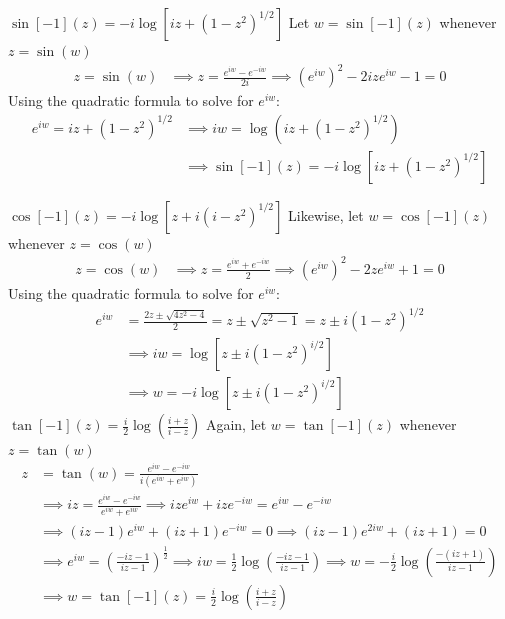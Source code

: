 \documentclass[12pt, english]{book}
\makeatletter
\renewenvironment{proof}[1][\proofname]{\par
	\pushQED{\qed}%
	\normalfont \topsep6\p@\@plus6\p@\relax
	\list{}{%
		\settowidth{\leftmargin}{\itshape\proofname:\hskip\labelsep}%
		\setlength{\labelwidth}{0pt}%
		\setlength{\itemindent}{-\leftmargin}%
		}%
	\item[\hskip\labelsep\itshape#1\@addpunct{:}]\ignorespaces
	}{\popQED\endlist\@endpefalse}
\makeatother
\begin{document}
	\begin{proof}
	\underline{\(\sin[-1](z) = -i \log[iz + (1-z^2)^{1/2}] \)} \newline
	Let \(w = \sin[-1](z)\) whenever \(z = \sin(w)\)
	\begin{align*}
		z = \sin(w)
		&\implies z = \frac{e^{iw} - e^{-iw}}{2i}
		 \implies (e^{iw})^2 - 2iz e^{iw} - 1 = 0
	\end{align*}
	Using the quadratic formula to solve for \(e^{iw}\): 
	\begin{align*}
		e^{iw} = iz + (1 - z^2)^{1/2} 
		&\implies iw = \log\left( iz + (1 - z^2)^{1/2} \right) \\
		&\implies \sin[-1](z) = -i \log\left[ iz + (1 - z^2)^{1/2} \right]
	\end{align*}

	\underline{\(\cos[-1](z) = -i \log[z + i(i-z^2)^{1/2}]\)} \newline
	{\color{Grey}
	Likewise, let \(w = \cos[-1](z)\) whenever \(z = \cos(w)\)
	\begin{align*}
		z = \cos(w)
		&\implies z = \frac{e^{iw} + e^{-iw}}{2}
		 \implies (e^{iw})^2 - 2ze^{iw} + 1 = 0
	\end{align*}
	Using the quadratic formula to solve for \(e^{iw}\): 
	\begin{align*}
		e^{iw} 
		&= \frac{2z \pm \sqrt{4z^2 - 4}}{2} = z \pm \sqrt{z^2 - 1} = z \pm i (1-z^2)^{1/2} \\
		&\implies iw = \log\left[z \pm i(1-z^2)^{i/2}\right] \\
		&\implies  w = -i\log\left[z \pm i(1-z^2)^{i/2}\right] 
	\end{align*}
	}
	\underline{\(\tan[-1](z) = \frac{i}{2} \log\left(\frac{i + z}{i - z}\right)\)} \newline
	{\color{Grey}
	Again, let \(w = \tan[-1](z)\) whenever \(z = \tan(w)\)
	\begin{align*}
		z &= \tan(w) = \frac{e^{iw} - e^{-iw}}{i(e^{iw} + e^{iw})} \\
		&\implies iz = \frac{e^{iw} - e^{-iw}}{e^{iw} + e^{iw}}
		\implies iz e^{iw} + iz e^{-iw} = e^{iw} - e^{-iw} \\
		&\implies (iz - 1)e^{iw} + (iz + 1)e^{-iw} = 0 
		\implies (iz - 1)e^{2iw} + (iz + 1) = 0 \\
		&\implies e^{iw} = \left(\frac{-iz - 1}{iz - 1}\right)^\frac{1}{2} 
		 \implies iw = \frac{1}{2} \log\left(\frac{-iz - 1}{iz - 1}\right) 
	 	 \implies w = -\frac{i}{2} \log\left(\frac{-(iz + 1)}{iz - 1}\right) \\
		&\implies w = \tan[-1](z) = \frac{i}{2} \log\left(\frac{i + z}{i - z}\right)
	\end{align*}
	}
	\end{proof}
	
\end{document}
